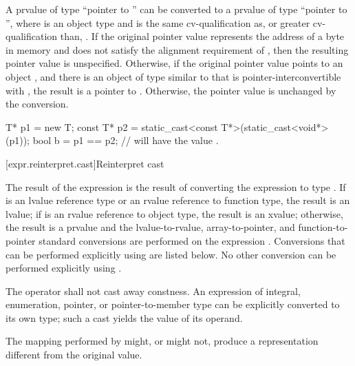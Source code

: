 \pnum
A prvalue of type ``pointer to  '' can be
converted to a prvalue of type ``pointer to  '',
where  is an object type and  is the same
cv-qualification as, or greater cv-qualification than, .
If the original pointer value represents the address
 of a byte in memory and
 does not satisfy the alignment requirement of ,
then the resulting pointer value is unspecified.
Otherwise, if the original pointer value points to an object ,
and there is an object  of type similar to 
that is pointer-interconvertible with ,
the result is a pointer to .
Otherwise, the pointer value is unchanged by the conversion.
\begin{example}
\begin{codeblock}
T* p1 = new T;
const T* p2 = static_cast<const T*>(static_cast<void*>(p1));
bool b = p1 == p2;  //  will have the value .
\end{codeblock}
\end{example}

[expr.reinterpret.cast]{Reinterpret cast}

\pnum
{}%
%
The result of the expression  is the
result of converting the expression  to type .
%
%
If  is an lvalue reference type or an rvalue reference to function type, the result is an lvalue;
if  is an rvalue reference to object type, the result is an xvalue;
otherwise, the result is a prvalue and the
lvalue-to-rvalue, array-to-pointer,
and function-to-pointer standard conversions are
performed on the expression . Conversions that can be performed explicitly
using  are listed below. No other conversion can
be performed explicitly using .

\pnum
The  operator shall not cast away constness.
An expression of integral, enumeration, pointer, or pointer-to-member type
can be explicitly converted to its own type; such a cast yields the value of
its operand.

\pnum
\begin{note}
The mapping performed by  might, or might not, produce a
representation different from the original value.
\end{note}

